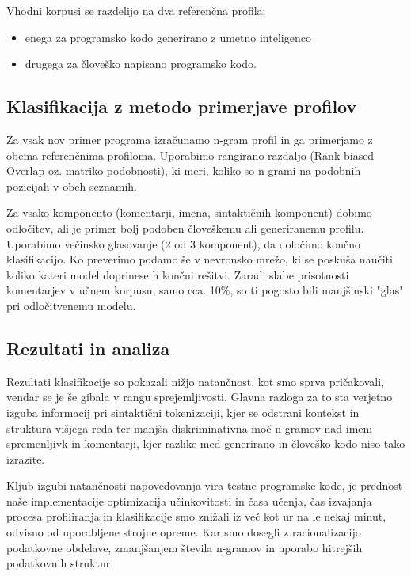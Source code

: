 \documentclass[sigconf,nonacm]{acmart}
\begin{document}
Vhodni korpusi se razdelijo na dva referenčna profila:
\begin{itemize}
	\item enega za programsko kodo generirano z umetno inteligenco
	\item drugega za človeško napisano programsko kodo.
\end{itemize}

\subsection{Klasifikacija z metodo primerjave profilov}
Za vsak nov primer programa izračunamo n-gram profil in ga primerjamo z obema referenčnima profiloma. Uporabimo rangirano razdaljo (Rank-biased Overlap oz. matriko podobnosti), ki meri, koliko so n-grami na podobnih pozicijah v obeh seznamih.

Za vsako komponento (komentarji, imena, sintaktičnih komponent) dobimo odločitev, ali je primer bolj podoben človeškemu ali generiranemu profilu. Uporabimo večinsko glasovanje (2 od 3 komponent), da določimo končno klasifikacijo. Ko preverimo podamo še v nevronsko mrežo, ki se poskuša naučiti koliko kateri model doprinese h končni rešitvi.
Zaradi slabe prisotnosti komentarjev v učnem korpusu, samo cca. 10\%, so ti pogosto bili manjšinski "glas" pri odločitvenemu modelu.

\subsection{Rezultati in analiza}
Rezultati klasifikacije so pokazali nižjo natančnost, kot smo sprva pričakovali, vendar se je še gibala v rangu sprejemljivosti. Glavna razloga za to sta verjetno izguba informacij pri sintaktični tokenizaciji, kjer se odstrani kontekst in struktura višjega reda ter manjša diskriminativna moč n-gramov nad imeni spremenljivk in komentarji, kjer razlike med generirano in človeško kodo niso tako izrazite.

Kljub izgubi natančnosti napovedovanja vira testne programske kode, je prednost naše implementacije optimizacija učinkovitosti in časa učenja, čas izvajanja procesa profiliranja in klasifikacije smo znižali iz več kot ur na le nekaj minut, odvisno od uporabljene strojne opreme.
Kar smo dosegli z racionalizacijo podatkovne obdelave, zmanjšanjem števila n-gramov in uporabo hitrejših podatkovnih struktur.
\end{document}
